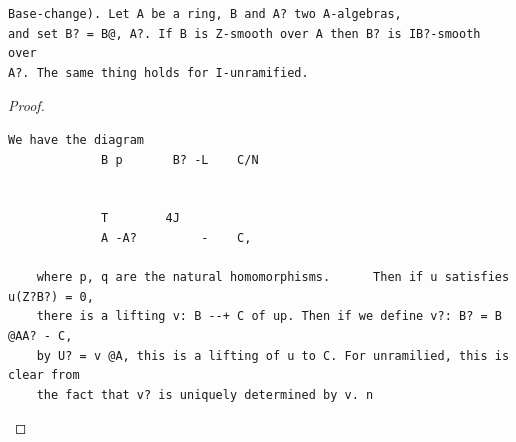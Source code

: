 \begin{theorem}\label{mcrt-auto-theorem-28-2}\uses{}
\begin{verbatim}
Base-change). Let A be a ring, B and A? two A-algebras,
and set B? = B@, A?. If B is Z-smooth over A then B? is IB?-smooth over
A?. The same thing holds for I-unramified.
\end{verbatim}
\end{theorem}
\begin{proof}
\begin{verbatim}
We have the diagram
             B p       B? -L    C/N


             T        4J
             A -A?         -    C,

    where p, q are the natural homomorphisms.      Then if u satisfies u(Z?B?) = 0,
    there is a lifting v: B --+ C of up. Then if we define v?: B? = B @AA? - C,
    by U? = v @A, this is a lifting of u to C. For unramilied, this is clear from
    the fact that v? is uniquely determined by v. n
\end{verbatim}
\end{proof}


